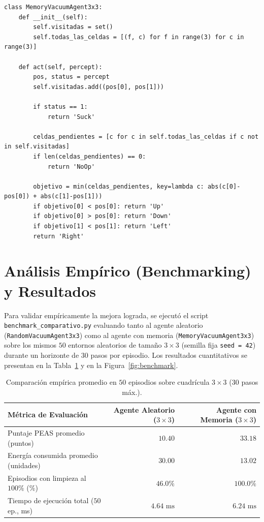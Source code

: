 \documentclass[runningheads]{llncs}
\begin{document}
\begin{lstlisting}[caption={Lógica principal del agente mejorado con memoria en Python.}]
class MemoryVacuumAgent3x3:
    def __init__(self):
        self.visitadas = set()
        self.todas_las_celdas = [(f, c) for f in range(3) for c in range(3)]

    def act(self, percept):
        pos, status = percept
        self.visitadas.add((pos[0], pos[1]))

        if status == 1:
            return 'Suck'

        celdas_pendientes = [c for c in self.todas_las_celdas if c not in self.visitadas]
        if len(celdas_pendientes) == 0:
            return 'NoOp'

        objetivo = min(celdas_pendientes, key=lambda c: abs(c[0]-pos[0]) + abs(c[1]-pos[1]))
        if objetivo[0] < pos[0]: return 'Up'
        if objetivo[0] > pos[0]: return 'Down'
        if objetivo[1] < pos[1]: return 'Left'
        return 'Right'
\end{lstlisting}


\section{Análisis Empírico (Benchmarking) y Resultados}

Para validar empíricamente la mejora lograda, se ejecutó el script \texttt{benchmark\_comparativo.py} evaluando tanto al agente aleatorio (\texttt{RandomVacuumAgent3x3}) como al agente con memoria (\texttt{MemoryVacuumAgent3x3}) sobre los mismos $50$ entornos aleatorios de tamaño $3\times 3$ (semilla fija \texttt{seed = 42}) durante un horizonte de $30$ pasos por episodio. Los resultados cuantitativos se presentan en la Tabla~\ref{tab:benchmark} y en la Figura~\ref{fig:benchmark}.

\begin{table}[htbp]
\centering
\caption{Comparación empírica promedio en $50$ episodios sobre cuadrícula $3\times 3$ ($30$ pasos máx.).}
\label{tab:benchmark}
\begin{tabular}{@{}lrr@{}}
\toprule
\textbf{Métrica de Evaluación} & \textbf{Agente Aleatorio ($3\times 3$)} & \textbf{Agente con Memoria ($3\times 3$)} \\ \midrule
Puntaje PEAS promedio (puntos) & $10.40$ & $\mathbf{33.18}$ \\
Energía consumida promedio (unidades) & $30.00$ & $\mathbf{13.02}$ \\
Episodios con limpieza al $100\%$ (\%) & $46.0\%$ & $\mathbf{100.0\%}$ \\
Tiempo de ejecución total ($50$ ep., ms) & $4.64\text{ ms}$ & $6.24\text{ ms}$ \\ \bottomrule
\end{tabular}
\end{table}
\end{document}
